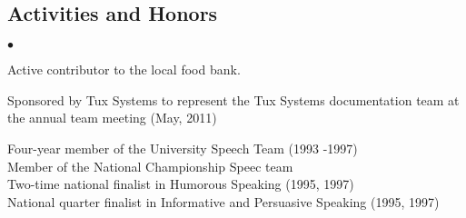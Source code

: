 \documentclass[margin,line]{res}
\newenvironment{list2}{
  \begin{list}{$\bullet$}{%
      \setlength{\itemsep}{0in} 
      \setlength{\parsep}{0in} \setlength{\parskip}{0in}
      \setlength{\topsep}{0in} \setlength{\partopsep}{0in} 
      \setlength{\leftmargin}{0.2in}}}{\end{list}}
\begin{document}
\begin{resume}
\section{\sc Activities and Honors} 
\begin{list2}
\item Active contributor to the local food bank.
\item Sponsored by Tux Systems to represent the Tux Systems documentation team 
at the annual team meeting (May, 2011) 
\item Four-year member of the University Speech Team (1993 -1997) \\
     Member of the National Championship Speec team \\
     Two-time national finalist in Humorous Speaking (1995, 1997) \\
     National quarter finalist in Informative and Persuasive Speaking (1995, 1997) \\
\end{list2}
\vspace*{-.3cm}

\end{resume}
\end{document}
